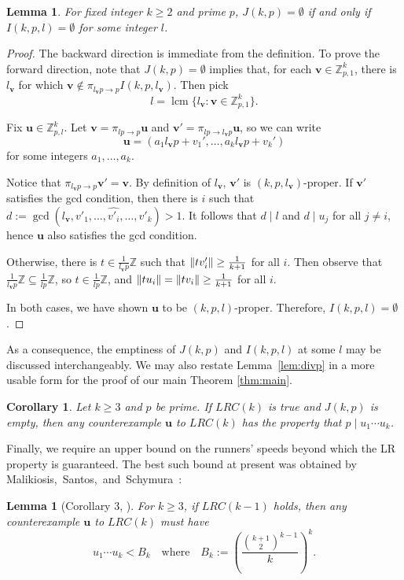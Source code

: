 \documentclass[11pt]{amsart}
\DeclarePairedDelimiter\norm{\lVert}{\rVert}
\newcommand{\Z}{\mathbb{Z}}
\newcommand{\vbf}{\mathbf{v}}
\newcommand{\ubf}{\mathbf{u}}
\newtheorem{lemma}[theorem]{Lemma}
\newtheorem{corollary}[theorem]{Corollary}
\theoremstyle{definition}
\theoremstyle{remark}
\begin{document}
\begin{lemma}
\label{lem:evenprop}
    For fixed integer $k \ge 2$ and prime $p$, $J(k,p)=\emptyset$ if and only if $I(k,p,l)=\emptyset$ for some integer $l$.
\end{lemma}
\begin{proof}
    The backward direction is immediate from the definition. 
    To prove the forward direction, note that $J(k,p)=\emptyset$ implies that,
    for each $\vbf\in \Z_{p,1}^k$, there is $l_\vbf$ for which $\vbf \notin \pi_{l_\vbf p \to p} I(k, p, l_\vbf)$. 
    Then pick \[l=\operatorname{lcm}\{l_\vbf:\vbf\in\Z_{p,1}^k\}.\] 
    
    Fix $\ubf\in\Z_{p,l}^k$. 
    Let $\vbf=\pi_{lp\rightarrow p}\ubf$ and $\vbf'=\pi_{lp\rightarrow l_\vbf p}\ubf$,
    so we can write \[\ubf=(a_1l_\vbf p+v_1',\ldots,a_kl_\vbf p+v_k')\] for some integers $a_1,\ldots,a_k$. 
    
    Notice that $\pi_{l_{\vbf}p \to p} \vbf' = \vbf$. 
    By definition of $l_\vbf$, $\vbf'$ is $(k,p,l_\vbf)$-proper. 
    If $\vbf'$ satisfies the gcd condition,
    then there is $i$ such that $d:=\gcd(l_\vbf, v'_1, \dots, \widehat{v'_{i}}, \dots, v'_k) > 1$. 
    It follows that $d\mid l$ and $d\mid u_j$ for all $j\neq i$, hence $\ubf$ also satisfies the gcd condition.

    Otherwise, there is $t\in\frac{1}{l_\vbf p}\Z$ such that $\norm{tv'_i}\geq\frac{1}{k+1}$ for all $i$. 
    Then observe that $\frac{1}{l_\vbf p}\Z\subseteq\frac{1}{lp}\Z$, so $t\in\frac{1}{lp}\Z$,
    and $\norm{tu_i}=\norm{tv_i}\geq\frac{1}{k+1}$ for all $i$.

    In both cases, we have shown $\ubf$ to be $(k,p,l)$-proper.
    Therefore, $I(k,p,l)=\emptyset$.
\end{proof}

As a consequence, the emptiness of $J(k,p)$ and $I(k,p,l)$ at some $l$ may be discussed interchangeably.
We may also restate Lemma~\ref{lem:divp} in a more usable form for the proof of our main Theorem \ref{thm:main}.
\begin{corollary}\label{cor:evenpropdivp}
  Let $k \ge 3$ and $p$ be prime.
  If $LRC(k)$ is true and $J(k,p)$ is empty, then any counterexample $\ubf$ to $LRC(k)$ has the property that $p \mid u_1\cdots u_k$.
\end{corollary}

Finally, we require an upper bound on the runners' speeds beyond which the LR property is guaranteed.
The best such bound at present was obtained by Malikiosis,~Santos,~and~Schymura~\cite{Malikiosis}:
\begin{lemma}[Corollary 3, \cite{Rosenfeld}] \label{lem:proddivB}
    For $k \ge 3$, if $LRC(k-1)$ holds, then any counterexample $\ubf$ to $LRC(k)$ must have
    \[ u_1\cdots u_k < B_k \quad \text{where} \quad B_k := \left( \frac{\binom{k+1}{2}^{k-1}}{k} \right)^k. \]
\end{lemma}
\end{document}
